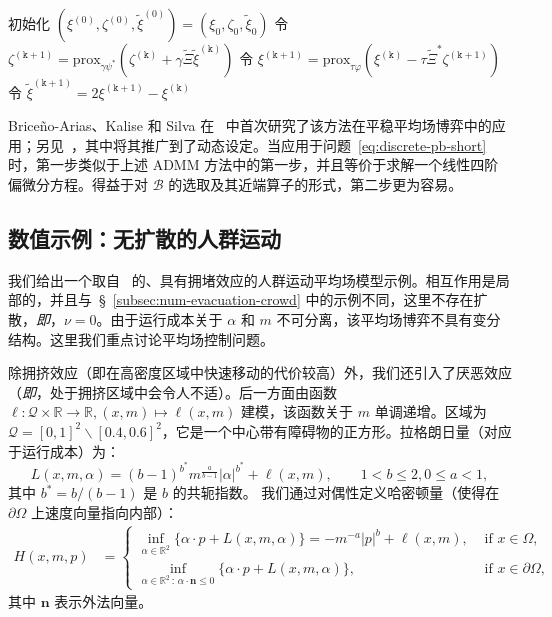 \documentclass{amsproc}
\theoremstyle{definition}
\theoremstyle{remark}
\numberwithin{equation}{section}
\newcommand{\RR}{{\mathbb R}}
\newcommand{\cB}{{\mathcal B}}
\newcommand{\cL}{{\mathcal L}}
\newcommand{\ctrl}{\alpha}
\newcommand{\dom}{\mathcal{Q}}
\newcommand{\prox}{\mathrm{prox}}
\begin{document}
\begin{algorithm}[H]
\DontPrintSemicolon
  
  \KwOutput{由~\eqref{AMS-num-eq:generic-LagSaddlePoint-PD} 定义的 $\cL_{PD}$ 的鞍点 $(\xi^*, \zeta^*)$ 的近似}
  初始化 $(\xi^{(0)}, \zeta^{(0)}, \tilde \xi^{(0)}) = (\xi_0, \zeta_0, \tilde \xi_0)$ \;
        { 
        令 $\zeta^{(\mathtt{k}+1)} = \prox_{\gamma \psi^*} (\zeta^{(\mathtt{k})} + \gamma \widetilde{\Xi} \tilde\xi^{(\mathtt{k})} ) $\;
        令 $\xi^{(\mathtt{k}+1)} = \prox_{\tau \varphi} (\xi^{(\mathtt{k})} - \tau \widetilde{\Xi}^* \zeta^{(\mathtt{k}+1)})$\;
	令 $\tilde\xi^{(\mathtt{k}+1)} = 2 \xi^{(\mathtt{k}+1)} - \xi^{(\mathtt{k})}$\;
	}
\caption{Chambolle-Pock 方法 \label{AMS-num-chambollepock-algo-generic}}
\end{algorithm}
 
Brice{\~n}o-Arias、Kalise 和 Silva 在~\cite{MR3772008} 中首次研究了该方法在平稳平均场博弈中的应用；另见~\cite{BricenoAriasetalCEMRACS2017}，其中将其推广到了动态设定。当应用于问题~\eqref{eq:discrete-pb-short} 时，第一步类似于上述 ADMM 方法中的第一步，并且等价于求解一个线性四阶偏微分方程。得益于对 $\cB$ 的选取及其近端算子的形式，第二步更为容易。







\subsection{数值示例：无扩散的人群运动}
\label{sec:auglag-crowd}
我们给出一个取自~\cite{MR3575615} 的、具有拥堵效应的人群运动平均场模型示例。相互作用是局部的，并且与~\S~\ref{subsec:num-evacuation-crowd} 中的示例不同，这里不存在扩散，\textit{即}，$\nu=0$。由于运行成本关于 $\ctrl$ 和 $m$ 不可分离，该平均场博弈不具有变分结构。这里我们重点讨论平均场控制问题。

除拥挤效应（即在高密度区域中快速移动的代价较高）外，我们还引入了厌恶效应（\textit{即}，处于拥挤区域中会令人不适）。后一方面由函数 $\ell: \dom \times \RR \to \RR, (x,m) \mapsto \ell(x,m)$ 建模，该函数关于 $m$ 单调递增。区域为 $\dom = [0,1]^2 \backslash [0.4,0.6]^2$，它是一个中心带有障碍物的正方形。拉格朗日量（对应于运行成本）为：
	$$
		L(x, m,\ctrl) = (b-1)^{b^*}  m^{\frac{a}{b-1}}|\ctrl|^{b^*} + \ell(x, m), 
		\qquad 1<b \leq 2, 0\leq a < 1,
	$$
	其中 $b^* = b/(b-1)$ 是 $b$ 的共轭指数。  
	我们通过对偶性定义哈密顿量（使得在 $\partial \Omega$ 上速度向量指向内部）：
	\begin{align*}
		 H(x, m, p) &=
		 \begin{cases}
		 	\displaystyle \inf_{\ctrl \in \RR^2} \big\{\ctrl \cdot p + L(x, m,\ctrl)\big\} = - m^{-a} |p|^{b} + \ell(x, m), &\mbox{ if } x \in \Omega, \\
			\displaystyle \inf_{\ctrl \in \RR^2 \,:\, \ctrl \cdot \mathbf{n} \leq 0} \big\{\ctrl \cdot p + L(x, m,\ctrl)\big\}, &\mbox{ if } x \in \partial \Omega,
		\end{cases}
	\end{align*}
	其中 $\mathbf{n}$ 表示外法向量。 
	
\end{document}
